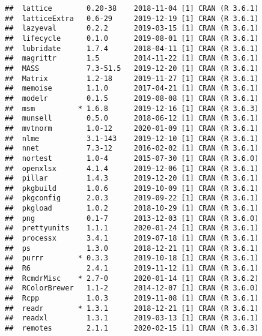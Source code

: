 \documentclass[
]{article}
\begin{document}
\begin{verbatim}
##  lattice        0.20-38    2018-11-04 [1] CRAN (R 3.6.1)                    
##  latticeExtra   0.6-29     2019-12-19 [1] CRAN (R 3.6.1)                    
##  lazyeval       0.2.2      2019-03-15 [1] CRAN (R 3.6.1)                    
##  lifecycle      0.1.0      2019-08-01 [1] CRAN (R 3.6.1)                    
##  lubridate      1.7.4      2018-04-11 [1] CRAN (R 3.6.1)                    
##  magrittr       1.5        2014-11-22 [1] CRAN (R 3.6.1)                    
##  MASS           7.3-51.5   2019-12-20 [1] CRAN (R 3.6.1)                    
##  Matrix         1.2-18     2019-11-27 [1] CRAN (R 3.6.1)                    
##  memoise        1.1.0      2017-04-21 [1] CRAN (R 3.6.1)                    
##  modelr         0.1.5      2019-08-08 [1] CRAN (R 3.6.1)                    
##  msm          * 1.6.8      2019-12-16 [1] CRAN (R 3.6.3)                    
##  munsell        0.5.0      2018-06-12 [1] CRAN (R 3.6.1)                    
##  mvtnorm        1.0-12     2020-01-09 [1] CRAN (R 3.6.1)                    
##  nlme           3.1-143    2019-12-10 [1] CRAN (R 3.6.1)                    
##  nnet           7.3-12     2016-02-02 [1] CRAN (R 3.6.1)                    
##  nortest        1.0-4      2015-07-30 [1] CRAN (R 3.6.0)                    
##  openxlsx       4.1.4      2019-12-06 [1] CRAN (R 3.6.1)                    
##  pillar         1.4.3      2019-12-20 [1] CRAN (R 3.6.1)                    
##  pkgbuild       1.0.6      2019-10-09 [1] CRAN (R 3.6.1)                    
##  pkgconfig      2.0.3      2019-09-22 [1] CRAN (R 3.6.1)                    
##  pkgload        1.0.2      2018-10-29 [1] CRAN (R 3.6.1)                    
##  png            0.1-7      2013-12-03 [1] CRAN (R 3.6.0)                    
##  prettyunits    1.1.1      2020-01-24 [1] CRAN (R 3.6.1)                    
##  processx       3.4.1      2019-07-18 [1] CRAN (R 3.6.1)                    
##  ps             1.3.0      2018-12-21 [1] CRAN (R 3.6.1)                    
##  purrr        * 0.3.3      2019-10-18 [1] CRAN (R 3.6.1)                    
##  R6             2.4.1      2019-11-12 [1] CRAN (R 3.6.1)                    
##  RcmdrMisc    * 2.7-0      2020-01-14 [1] CRAN (R 3.6.2)                    
##  RColorBrewer   1.1-2      2014-12-07 [1] CRAN (R 3.6.0)                    
##  Rcpp           1.0.3      2019-11-08 [1] CRAN (R 3.6.1)                    
##  readr        * 1.3.1      2018-12-21 [1] CRAN (R 3.6.1)                    
##  readxl         1.3.1      2019-03-13 [1] CRAN (R 3.6.1)                    
##  remotes        2.1.1      2020-02-15 [1] CRAN (R 3.6.3)                    

\end{verbatim}
\end{document}
